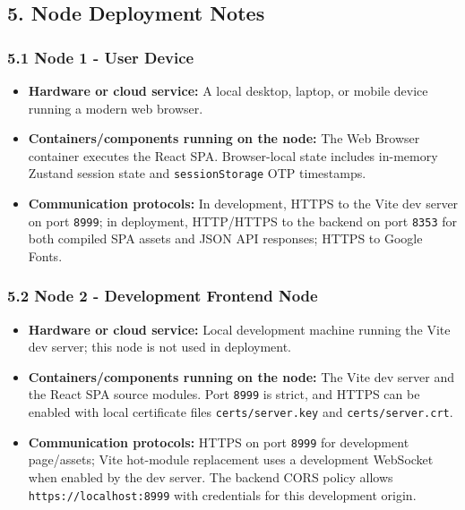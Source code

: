 \documentclass[12pt]{article}
\begin{document}
\endgroup
\par\medskip

\hypertarget{sec:5-node-deployment-notes}{}
\subsection*{5. Node Deployment Notes}
\par\medskip

\hypertarget{sec:5-1-node-1-user-device}{}
\subsubsection*{5.1 Node 1 - User Device}
\par\medskip

\begin{itemize}
\item \textbf{Hardware or cloud service:} A local desktop, laptop, or mobile device running a modern web browser.
\item \textbf{Containers/components running on the node:} The Web Browser container executes the React SPA. Browser-local state includes in-memory Zustand session state and \texttt{sessionStorage} OTP timestamps.
\item \textbf{Communication protocols:} In development, HTTPS to the Vite dev server on port \texttt{8999}; in deployment, HTTP/HTTPS to the backend on port \texttt{8353} for both compiled SPA assets and JSON API responses; HTTPS to Google Fonts.
\end{itemize}
\par\medskip

\hypertarget{sec:5-2-node-2-development-frontend-node}{}
\subsubsection*{5.2 Node 2 - Development Frontend Node}
\par\medskip

\begin{itemize}
\item \textbf{Hardware or cloud service:} Local development machine running the Vite dev server; this node is not used in deployment.
\item \textbf{Containers/components running on the node:} The Vite dev server and the React SPA source modules. Port \texttt{8999} is strict, and HTTPS can be enabled with local certificate files \texttt{certs/server.key} and \texttt{certs/server.crt}.
\item \textbf{Communication protocols:} HTTPS on port \texttt{8999} for development page/assets; Vite hot-module replacement uses a development WebSocket when enabled by the dev server. The backend CORS policy allows \texttt{https://localhost:8999} with credentials for this development origin.
\end{itemize}
\par\medskip
\end{document}
